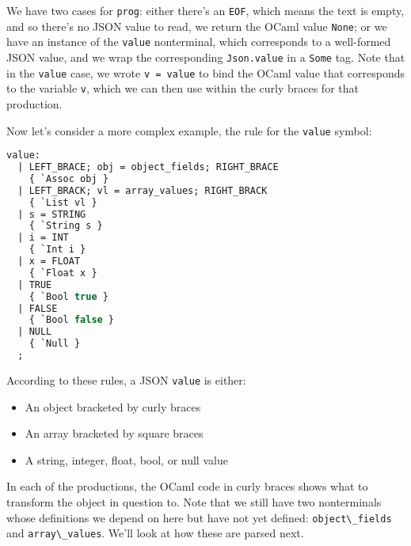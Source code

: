 We have two cases for \passthrough{\lstinline!prog!}: either there's an
\passthrough{\lstinline!EOF!}, which means the text is empty, and so
there's no JSON value to read, we return the OCaml value
\passthrough{\lstinline!None!}; or we have an instance of the
\passthrough{\lstinline!value!} nonterminal, which corresponds to a
well-formed JSON value, and we wrap the corresponding
\passthrough{\lstinline!Json.value!} in a \passthrough{\lstinline!Some!}
tag. Note that in the \passthrough{\lstinline!value!} case, we wrote
\passthrough{\lstinline!v = value!} to bind the OCaml value that
corresponds to the variable \passthrough{\lstinline!v!}, which we can
then use within the curly braces for that production.

Now let's consider a more complex example, the rule for the
\passthrough{\lstinline!value!} symbol:

\begin{lstlisting}[language=Caml]
value:
  | LEFT_BRACE; obj = object_fields; RIGHT_BRACE
    { `Assoc obj }
  | LEFT_BRACK; vl = array_values; RIGHT_BRACK
    { `List vl }
  | s = STRING
    { `String s }
  | i = INT
    { `Int i }
  | x = FLOAT
    { `Float x }
  | TRUE
    { `Bool true }
  | FALSE
    { `Bool false }
  | NULL
    { `Null }
  ;
\end{lstlisting}

According to these rules, a JSON \passthrough{\lstinline!value!} is
either: 

\begin{itemize}
\item
  An object bracketed by curly braces
\item
  An array bracketed by square braces
\item
  A string, integer, float, bool, or null value
\end{itemize}

In each of the productions, the OCaml code in curly braces shows what to
transform the object in question to. Note that we still have two
nonterminals whose definitions we depend on here but have not yet
defined: \passthrough{\lstinline!object\_fields!} and
\passthrough{\lstinline!array\_values!}. We'll look at how these are
parsed next.

\hypertarget{parsing-sequences}{%
\subsubsection{Parsing Sequences}\label{parsing-sequences}}


